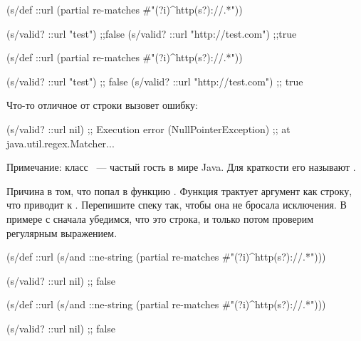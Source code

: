 \pagebreaklarge


\ifnarrow

\begin{clojure}
(s/def ::url
  (partial
    re-matches #"(?i)^http(s?)://.*"))

(s/valid? ::url "test") ;;false
(s/valid? ::url "http://test.com") ;;true
\end{clojure}

\else

\begin{clojure}
(s/def ::url
  (partial re-matches #"(?i)^http(s?)://.*"))

(s/valid? ::url "test")            ;; false
(s/valid? ::url "http://test.com") ;; true
\end{clojure}

\fi

Что-то отличное от строки вызовет ошибку:


\begin{clojure}
(s/valid? ::url nil)
;; Execution error (NullPointerException)
;; at java.util.regex.Matcher...
\end{clojure}


Примечание: класс ~--- частый гость в мире Java. Для
краткости его называют .

Причина в том, что  попал в функцию . Функция
трактует аргумент как строку, что приводит к . Перепишите спеку так,
чтобы она не бросала исключения. В примере с  сначала убедимся,
что это строка, и только потом проверим регулярным выражением.

\ifnarrow

\begin{clojure}
(s/def ::url
  (s/and ::ne-string
         (partial re-matches
           #"(?i)^http(s?)://.*")))

(s/valid? ::url nil) ;; false
\end{clojure}

\else

\begin{clojure}
(s/def ::url
  (s/and ::ne-string
         (partial re-matches #"(?i)^http(s?)://.*")))

(s/valid? ::url nil) ;; false
\end{clojure}

